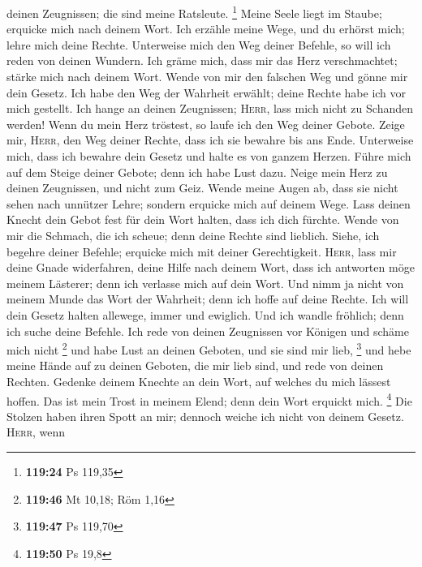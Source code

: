 deinen Zeugnissen; die sind meine Ratsleute. \footnote{\textbf{119:24}
  Ps 119,35}  Meine Seele liegt im Staube; erquicke mich
nach deinem Wort.  Ich erzähle meine Wege, und du erhörst
mich; lehre mich deine Rechte.  Unterweise mich den Weg
deiner Befehle, so will ich reden von deinen Wundern. 
Ich gräme mich, dass mir das Herz verschmachtet; stärke mich nach deinem
Wort.  Wende von mir den falschen Weg und gönne mir dein
Gesetz.  Ich habe den Weg der Wahrheit erwählt; deine
Rechte habe ich vor mich gestellt.  Ich hange an deinen
Zeugnissen; \textsc{Herr}, lass mich nicht zu Schanden werden!
 Wenn du mein Herz tröstest, so laufe ich den Weg deiner
Gebote.  Zeige mir, \textsc{Herr}, den Weg deiner Rechte,
dass ich sie bewahre bis ans Ende.  Unterweise mich, dass
ich bewahre dein Gesetz und halte es von ganzem Herzen. 
Führe mich auf dem Steige deiner Gebote; denn ich habe Lust dazu.
 Neige mein Herz zu deinen Zeugnissen, und nicht zum
Geiz.  Wende meine Augen ab, dass sie nicht sehen nach
unnützer Lehre; sondern erquicke mich auf deinem Wege. 
Lass deinen Knecht dein Gebot fest für dein Wort halten, dass ich dich
fürchte.  Wende von mir die Schmach, die ich scheue; denn
deine Rechte sind lieblich.  Siehe, ich begehre deiner
Befehle; erquicke mich mit deiner Gerechtigkeit. 
\textsc{Herr}, lass mir deine Gnade widerfahren, deine Hilfe nach deinem
Wort,  dass ich antworten möge meinem Lästerer; denn ich
verlasse mich auf dein Wort.  Und nimm ja nicht von
meinem Munde das Wort der Wahrheit; denn ich hoffe auf deine Rechte.
 Ich will dein Gesetz halten allewege, immer und
ewiglich.  Und ich wandle fröhlich; denn ich suche deine
Befehle.  Ich rede von deinen Zeugnissen vor Königen und
schäme mich nicht \footnote{\textbf{119:46} Mt 10,18; Röm 1,16}
 und habe Lust an deinen Geboten, und sie sind mir lieb,
\footnote{\textbf{119:47} Ps 119,70}  und hebe meine
Hände auf zu deinen Geboten, die mir lieb sind, und rede von deinen
Rechten.  Gedenke deinem Knechte an dein Wort, auf
welches du mich lässest hoffen.  Das ist mein Trost in
meinem Elend; denn dein Wort erquickt mich. \footnote{\textbf{119:50} Ps
  19,8}  Die Stolzen haben ihren Spott an mir; dennoch
weiche ich nicht von deinem Gesetz.  \textsc{Herr}, wenn
